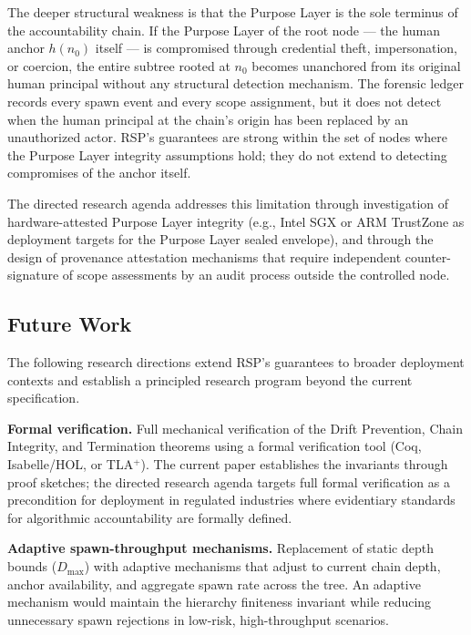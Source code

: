 The deeper structural weakness is that the Purpose Layer is the sole terminus of the accountability chain. If the Purpose Layer of the root node — the human anchor $h(n_0)$ itself — is compromised through credential theft, impersonation, or coercion, the entire subtree rooted at $n_0$ becomes unanchored from its original human principal without any structural detection mechanism. The forensic ledger records every spawn event and every scope assignment, but it does not detect when the human principal at the chain's origin has been replaced by an unauthorized actor. RSP's guarantees are strong within the set of nodes where the Purpose Layer integrity assumptions hold; they do not extend to detecting compromises of the anchor itself.

The directed research agenda addresses this limitation through investigation of hardware-attested Purpose Layer integrity (e.g., Intel SGX or ARM TrustZone as deployment targets for the Purpose Layer sealed envelope), and through the design of provenance attestation mechanisms that require independent counter-signature of scope assessments by an audit process outside the controlled node.

\subsection{Future Work}\label{sec:rs-future-work}

The following research directions extend RSP's guarantees to broader deployment contexts and establish a principled research program beyond the current specification.

\textbf{Formal verification.} Full mechanical verification of the Drift Prevention, Chain Integrity, and Termination theorems using a formal verification tool (Coq, Isabelle/HOL, or TLA$^+$). The current paper establishes the invariants through proof sketches; the directed research agenda targets full formal verification as a precondition for deployment in regulated industries where evidentiary standards for algorithmic accountability are formally defined.

\textbf{Adaptive spawn-throughput mechanisms.} Replacement of static depth bounds ($D_{\max}$) with adaptive mechanisms that adjust to current chain depth, anchor availability, and aggregate spawn rate across the tree. An adaptive mechanism would maintain the hierarchy finiteness invariant while reducing unnecessary spawn rejections in low-risk, high-throughput scenarios.

